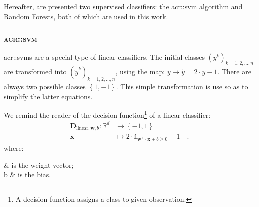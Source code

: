         Hereafter, are presented two supervised classifiers: the \gls{acr::svm} algorithm and Random Forests, both of which are used in this work.

        \subsubsection{\textsc{\acrlong*{acr::svm}}}
            \label{subsubsec::state_of_the_art::mlpr::classifiers::svm}
            \glspl{acr::svm} are a special type of linear classifiers.
            The initial classes $\left(y^k\right)_{k=1, 2, \dots, n}$ are transformed into $\left(\tilde{y}^k\right)_{k=1, 2, \dots, n}$, using the map: $y \mapsto \tilde{y} = 2\cdot y - 1$.
            There are always two possible classes $\left\{1, -1\right\}$.
            This simple transformation is use so as to simplify the latter equations.

            We remind the reader of the decision function\footnote{A decision function assigns a class to given observation.} of a linear classifier:
            \begin{equation}
                \label{eq::linear}
                \begin{aligned}
                    \mathbf{D}_{\text{linear}, \bm{w}, b}: \mathbb{R}^d &\rightarrow \left\{-1, 1\right\}\\
                    \bm{x} &\mapsto 2 \cdot \mathbb{1}_{\bm{w}^\intercal \cdot \bm{x} + b\geq 0} - 1 \quad.
                \end{aligned}
            \end{equation}
            where:
            \begin{conditions}
                 & is the weight vector;\\
                b & is the bias.
            \end{conditions}

